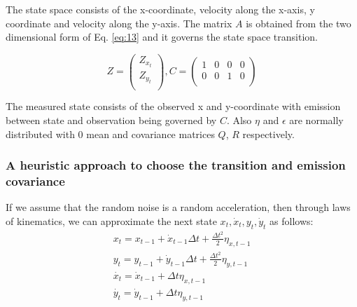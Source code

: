 \documentclass{article}
\begin{document}
The state space consists of the x-coordinate, velocity along the x-axis, y coordinate and velocity along the y-axis. The matrix $A$ is obtained from the two dimensional form of Eq. \ref{eq:13} and it governs the state space transition. 

$$
Z=\begin{pmatrix}
Z_{x_{t}}\\
Z_{y_{t}}\\
\end{pmatrix}, 
C=\begin{pmatrix} 1 & 0 & 0 & 0\\
0 & 0 & 1 & 0\\
\end{pmatrix}
$$ 

The measured state consists of the observed x and y-coordinate with emission between state and observation being governed by $C$. 
Also $\eta$ and $\epsilon$ are normally distributed with 0 mean and covariance matrices $Q$, $R$ respectively. 



\subsubsection{A heuristic approach to choose the transition and emission covariance}\label{ssec:heuristic_Q_R}
If we assume that the random noise is a random acceleration, then through laws of kinematics, we can approximate the next state $x_t, \dot{x}_t, y_t, \dot{y}_t  $ as follows:
\begin{equation}\label{eq:16}
    \begin{split}
        x_t=x_{t-1}+\dot{x}_{t-1}\Delta t +\frac{\Delta t^2}{2}\eta_{x,t-1}\\
        y_t=y_{t-1}+\dot{y}_{t-1}\Delta t +\frac{\Delta t^2}{2}\eta_{y,t-1}\\
        \dot{x_t}=\dot{x}_{t-1} + \Delta t \eta_{x,t-1}\\
        \dot{y_t}=\dot{y}_{t-1} + \Delta t \eta_{y,t-1}
    \end{split}
\end{equation}
\end{document}
